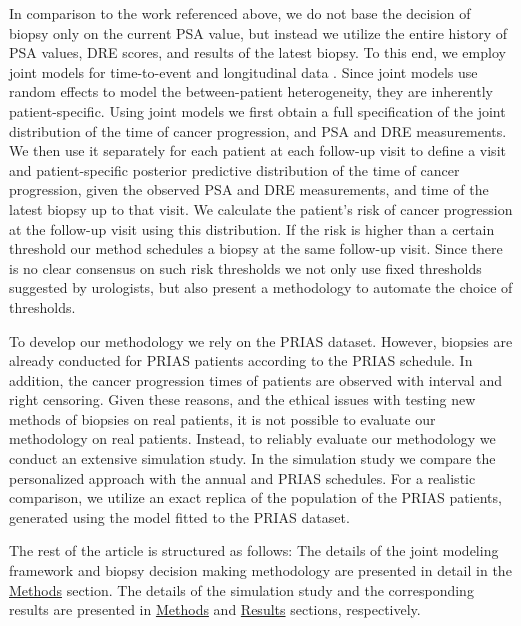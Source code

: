 In comparison to the work referenced above, we do not base the decision of biopsy only on the current PSA value, but instead we utilize the entire history of PSA values, DRE scores, and results of the latest biopsy. To this end, we employ joint models for time-to-event and longitudinal data \cite{tsiatis2004joint,rizopoulos2012joint}. Since joint models use random effects \cite{laird1982random} to model the between-patient heterogeneity, they are inherently patient-specific. Using joint models we first obtain a full specification of the joint distribution of the time of cancer progression, and PSA and DRE measurements. We then use it separately for each patient at each follow-up visit to define a visit and patient-specific posterior predictive distribution of the time of cancer progression, given the observed PSA and DRE measurements, and time of the latest biopsy up to that visit. We calculate the patient's risk of cancer progression at the follow-up visit using this distribution. If the risk is higher than a certain threshold our method schedules a biopsy at the same follow-up visit. Since there is no clear consensus on such risk thresholds we not only use fixed thresholds suggested by urologists, but also present a methodology to automate the choice of thresholds. 

To develop our methodology we rely on the PRIAS dataset. However, biopsies are already conducted for PRIAS patients according to the PRIAS schedule. In addition, the cancer progression times of patients are observed with interval and right censoring. Given these reasons, and the ethical issues with testing new methods of biopsies on real patients, it is not possible to evaluate our methodology on real patients. Instead, to reliably evaluate our methodology we conduct an extensive simulation study. In the simulation study we compare the personalized approach with the annual and PRIAS schedules. For a realistic comparison, we utilize an exact replica of the population of the PRIAS patients, generated using the model fitted to the PRIAS dataset. 

The rest of the article is structured as follows: The details of the joint modeling framework and biopsy decision making methodology are presented in detail in the \hyperref[sec:methods]{Methods} section. The details of the simulation study and the corresponding results are presented in \hyperref[sec:methods]{Methods} and \hyperref[sec:results]{Results} sections, respectively.
